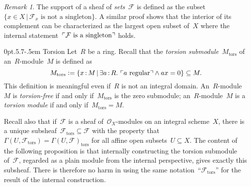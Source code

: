 \documentclass[10pt,reqno,a4paper]{amsbook}
\makeatletter
\theoremstyle{definition}
\theoremstyle{plain}
\theoremstyle{remark}
\newtheorem{rem}[defn]{Remark}
\newcommand{\F}{\mathcal{F}}
\renewcommand{\O}{\mathcal{O}}
\newcommand{\tors}{\mathrm{tors}}
\newcommand{\?}{\,{:}\,}
\renewcommand{\_}{\mathpunct{.}\,}
\newcommand{\speak}[1]{\ulcorner\text{\textnormal{#1}}\urcorner}
\newcommand{\defeq}{\vcentcolon=}
\def\subsection{\@startsection{subsection}{2}%
  {0pt}{.5\linespacing\@plus.7\linespacing}{-.5em}%
  {\normalfont\bfseries}}
\makeatother
\begin{document}
\begin{rem}\label{rem:support-sheaf-of-sets}
The support of a sheaf of \emph{sets}~$\F$ is defined as the subset~$\{ x \in X \,|\,
\text{$\F_x$ is not a singleton} \}$. A similar proof shows that the interior
of its complement can be characterized as the largest open subset of~$X$ where
the internal statement~$\speak{$\F$ is a singleton}$ holds.\end{rem}


\subsection{Torsion} Let~$R$ be a ring. Recall that the
\emph{torsion submodule}~$M_\tors$ of an~$R$-module~$M$ is defined as
\[ M_\tors \defeq \{ x\?M \,|\, \exists a\?R\_ \speak{$a$ regular} \wedge ax = 0 \}
\subseteq M. \]
This definition is meaningful even if~$R$ is not an integral domain.
An~$R$-module~$M$ is \emph{torsion-free} if and only if~$M_\tors$ is
the zero submodule; an~$R$-module~$M$ is a \emph{torsion module} if and only
if~$M_\tors = M$.

Recall also that if~$\F$ is a sheaf of~$\O_X$-modules on an integral
scheme~$X$, there is a unique subsheaf~$\F_\tors \subseteq \F$ with the
property that~$\Gamma(U,\F_\tors) = \Gamma(U,\F)_\tors$ for all affine open
subsets~$U \subseteq X$. The content of the following proposition is that
internally constructing the torsion submodule of~$\F$, regarded as a plain
module from the internal perspective, gives exactly this subsheaf. There is
therefore no harm in using the same notation~``$\F_\tors$'' for the result of
the internal construction.
\end{document}
